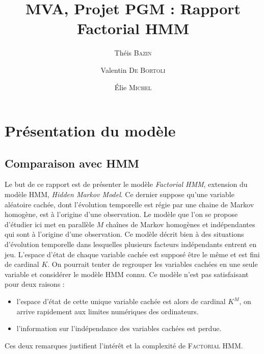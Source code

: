 \documentclass[10pt,a4paper]{article}
\title{MVA, Projet PGM : Rapport\\
  Factorial HMM}
\author{Théis \textsc{Bazin} \and Valentin \textsc{De Bortoli} \and Élie 
\textsc{Michel}}
\newcommand{\hmm}{\textsc{HMM}}
\newcommand{\fhmm}{\textsc{Factorial HMM}}
\begin{document}
\maketitle

\section{Présentation du modèle}
\subsection{Comparaison avec HMM}
Le but de ce rapport est de présenter le modèle \emph{Factorial HMM}, extension 
du modèle \hmm, \emph{Hidden Markov Model}. Ce dernier suppose qu'une variable 
aléatoire cachée, dont l'évolution temporelle est régie par une chaine de 
Markov homogène, est à l'origine d'une observation. Le modèle que l'on se 
propose d'étudier ici met en parallèle $M$ chaînes de Markov homogènes et 
indépendantes qui sont à l'origine d'une observation. Ce modèle décrit bien à 
des situations d'évolution temporelle dans lesquelles plusieurs facteurs 
indépendants entrent en jeu. L'espace d'état de chaque variable cachée est 
supposé être le même et est fini de cardinal $K$. On pourrait tenter de 
regrouper les variables cachées en une seule variable et considérer le modèle 
\hmm{} connu. Ce modèle n'est pas satisfaisant pour deux raisons :
\begin{itemize}
\item l'espace d'état de cette unique variable cachée est alors de cardinal 
$K^M$, on arrive rapidement aux limites numériques des ordinateurs.
\item l'information sur l'indépendance des variables cachées est perdue.
\end{itemize}
Ces deux remarques justifient l'intérêt et la complexité de \fhmm.
\end{document}
